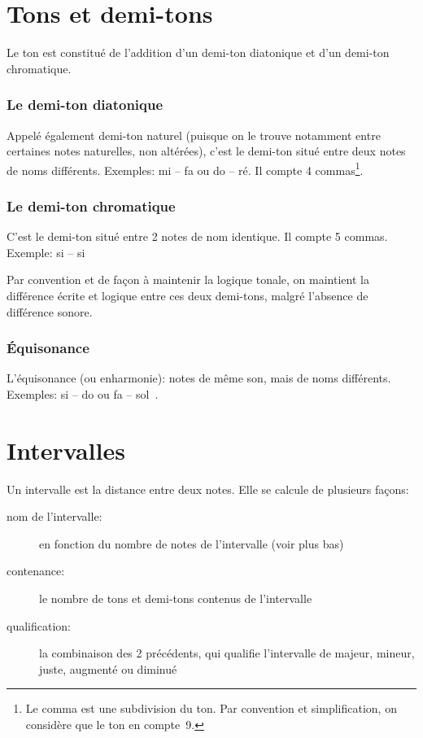 \documentclass[11pt,a4paper]{scrreprt}
\begin{document}
\section{Tons et demi-tons}
Le ton est constitué de l'addition d'un demi-ton diatonique et d'un demi-ton chromatique.
\subsubsection{Le demi-ton diatonique}
Appelé également demi-ton naturel (puisque on le trouve notamment entre certaines notes naturelles, non altérées), c'est le demi-ton situé entre deux notes de noms différents. Exemples: mi -- fa ou do \fetasharp{} -- ré. Il compte 4 commas\footnote{Le comma est une subdivision du ton. Par convention et simplification, on considère que le ton en compte~9.}.
\subsubsection{Le demi-ton chromatique}
C'est le demi-ton situé entre 2 notes de nom identique. Il compte 5 commas. Exemple: si -- si \fetaflat


Par convention et de façon à maintenir la logique tonale, on maintient la différence écrite et logique entre ces deux demi-tons, malgré l'absence de différence sonore.
\subsubsection{Équisonance}
L'équisonance (ou enharmonie): notes de même son, mais de noms différents. Exemples: si -- do \fetaflat{} ou fa \fetasharp{} -- sol~\fetaflat.

\section{Intervalles}
Un intervalle est la distance entre deux notes. Elle se calcule de plusieurs façons:
\begin{description}
\item[nom de l'intervalle:] en fonction du nombre de notes de l'intervalle (voir plus bas) 
\item[contenance:] le nombre de tons et demi-tons contenus de l'intervalle
\item[qualification:] la combinaison des 2 précédents, qui qualifie l'intervalle de majeur, mineur, juste, augmenté ou diminué
\end{description}
\end{document}
